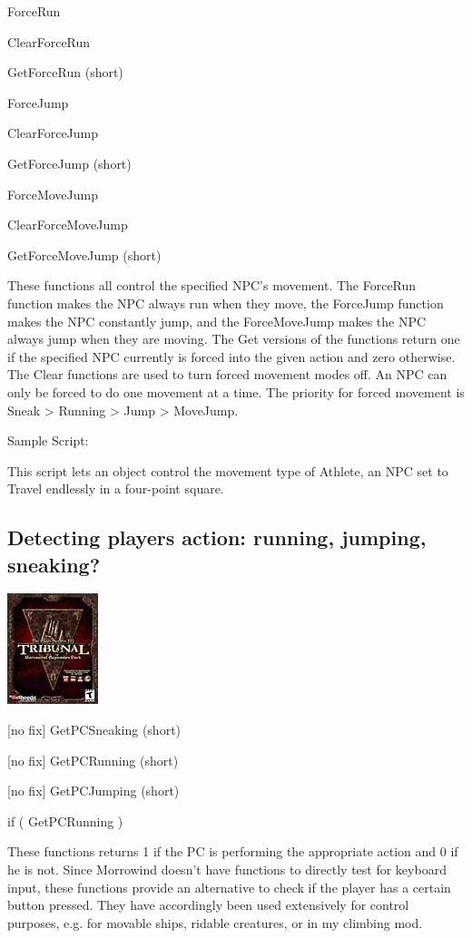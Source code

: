 ForceRun

ClearForceRun

GetForceRun (short)

ForceJump

ClearForceJump

GetForceJump (short)

ForceMoveJump

ClearForceMoveJump

GetForceMoveJump (short)

These functions all control the specified NPC's movement. The ForceRun
function makes the NPC always run when they move, the ForceJump function
makes the NPC constantly jump, and the ForceMoveJump makes the NPC
always jump when they are moving. The Get versions of the functions
return one if the specified NPC currently is forced into the given
action and zero otherwise. The Clear functions are used to turn forced
movement modes off. An NPC can only be forced to do one movement at a
time. The priority for forced movement is Sneak > Running
> Jump > MoveJump.

Sample Script:

This script lets an object control the movement type of Athlete, an NPC
set to Travel endlessly in a four-point square.



\hypertarget{detecting-players-action-running-jumping-sneaking}{%
\subsection{Detecting players action: running, jumping,
sneaking?}\label{detecting-players-action-running-jumping-sneaking}}

\includegraphics{media/image6.png}

{[}no fix{]} GetPCSneaking (short)

{[}no fix{]} GetPCRunning (short)

{[}no fix{]} GetPCJumping (short)

if ( GetPCRunning )

These functions returns 1 if the PC is performing the appropriate action
and 0 if he is not. Since Morrowind doesn't have functions to directly
test for keyboard input, these functions provide an alternative to check
if the player has a certain button pressed. They have accordingly been
used extensively for control purposes, e.g. for movable ships, ridable
creatures, or in my climbing mod.

